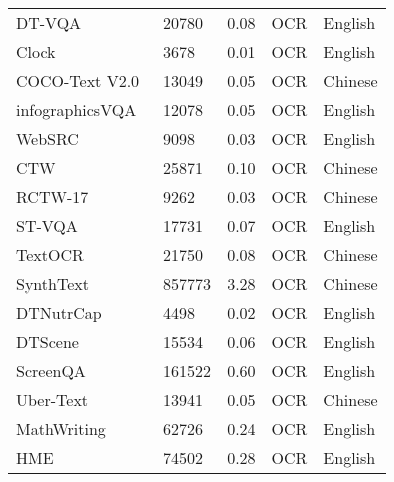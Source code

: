 \begin{table}[h]
\begin{tabular}{l|l|l|l|l}
DT-VQA~\cite{zhang2024exploring}                          & 20780   & 0.08     & OCR          & English         \\
Clock~\cite{yang2022s}                           & 3678    & 0.01        & OCR          & English         \\
COCO-Text V2.0~\cite{veit2016cocotext}                  & 13049   & 0.05     & OCR          & Chinese         \\
infographicsVQA~\cite{mathew2021infographicvqa}                 & 12078    & 0.05     & OCR          & English         \\
WebSRC~\cite{chen-etal-2021-websrc}                          & 9098    & 0.03     & OCR          & English         \\
CTW~\cite{yuan2019ctw}                        & 25871   & 0.10      & OCR          & Chinese         \\
RCTW-17~\cite{shi2017icdar2017}                            & 9262    & 0.03     & OCR          & Chinese         \\
ST-VQA~\cite{biten2019scene}                          & 17731   & 0.07     & OCR          & English         \\
TextOCR~\cite{singh2021textocr}                         & 21750   & 0.08     & OCR          & Chinese         \\
SynthText~\cite{Gupta16}                  & 857773  & 3.28     & OCR          & Chinese         \\
DTNutrCap~\cite{zhang2024exploring}                       & 4498    & 0.02     & OCR          & English         \\
DTScene~\cite{zhang2024exploring}                         & 15534    & 0.06     & OCR          & English         \\
ScreenQA~\cite{baechler2024screenai}                        & 161522   & 0.60     & OCR          & English         \\
Uber-Text~\cite{UberText}                       & 13941   & 0.05     & OCR          & Chinese         \\
MathWriting~\cite{gervais2024mathwriting}                     & 62726   & 0.24     & OCR          & English         \\
HME~\cite{yuan2022syntax}                             & 74502   & 0.28     & OCR          & English         \\

\end{tabular}
\end{table}
